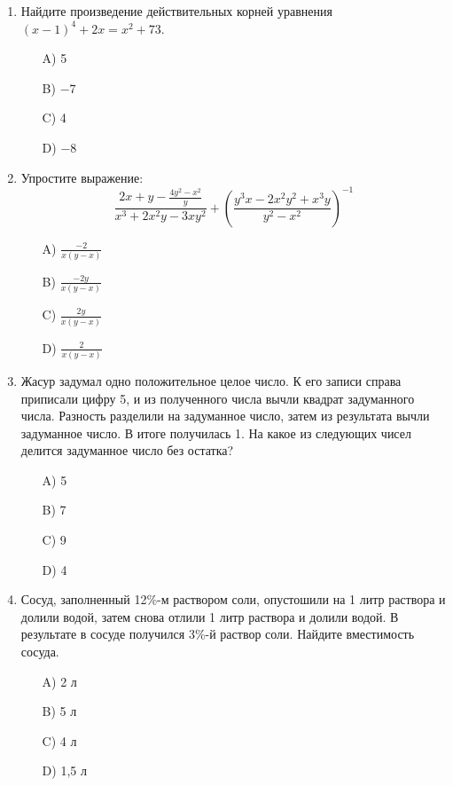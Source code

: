 \documentclass[12pt]{article}
\begin{document}
\begin{enumerate}
\vspace{0.cm} %

\item Найдите произведение действительных корней уравнения \((x - 1)^4 + 2x = x^2 + 73\). \\
\textbf{}
\begin{enumerate}
    \item[A)] 5
    \item[B)] \(-7\)
    \item[C)] 4
    \item[D)] \(-8\)
\end{enumerate}

\vspace{0.cm} %

\item Упростите выражение:
\[
\frac{2x+y-\frac{4y^2-x^2}{y}}{x^3+2x^2y-3xy^2} + \left( \frac{y^3x-2x^2y^2+x^3y}{y^2-x^2} \right)^{-1}
\]
\textbf{}
\begin{enumerate}
    \item[A)] \(\frac{-2}{x(y-x)}\)
    \item[B)] \(\frac{-2y}{x(y-x)}\)
    \item[C)] \(\frac{2y}{x(y-x)}\)
    \item[D)] \(\frac{2}{x(y-x)}\)
\end{enumerate}

\vspace{0.cm} %

\item Жасур задумал одно положительное целое число. К его записи справа приписали цифру 5, и из полученного числа вычли квадрат задуманного числа. Разность разделили на задуманное число, затем из результата вычли задуманное число. В итоге получилась 1. На какое из следующих чисел делится задуманное число без остатка? \\
\textbf{}
\begin{enumerate}
    \item[A)] 5
    \item[B)] 7
    \item[C)] 9
    \item[D)] 4
\end{enumerate}

\vspace{0.cm} %

\item Сосуд, заполненный 12\%-м раствором соли, опустошили на 1 литр раствора и долили водой, затем снова отлили 1 литр раствора и долили водой. В результате в сосуде получился 3\%-й раствор соли. Найдите вместимость сосуда. \\
\textbf{}
\begin{enumerate}
    \item[A)] 2 л
    \item[B)] 5 л
    \item[C)] 4 л
    \item[D)] 1,5 л
\end{enumerate}


\end{enumerate}
\end{document}
